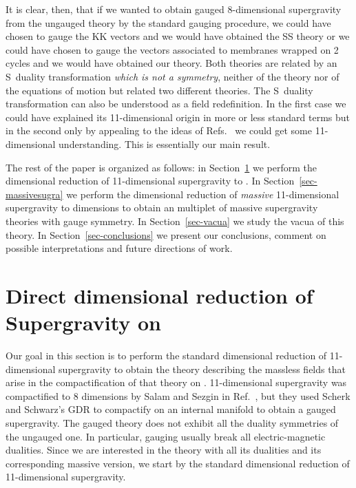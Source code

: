 \documentclass[12pt,a4paper]{article}
\begin{document}
It is clear, then, that if we wanted to obtain gauged 8-dimensional
supergravity from the ungauged theory by the standard gauging
procedure, we could have chosen to gauge the KK vectors and we would
have obtained the SS theory or we could have chosen to gauge the
vectors associated to membranes wrapped on 2 cycles and we would have
obtained our theory. Both theories are related by an S~duality
transformation {\it which is not a symmetry}, neither of the theory
nor of the equations of motion but related two different theories. The
S~duality transformation can also be understood as a field
redefinition.  In the first case we could have explained its
11-dimensional origin in more or less standard terms but in the second
only by appealing to the ideas of Refs.~\cite{kn:BLO,kn:MO} we could
get some 11-dimensional understanding.  This is essentially our main
result.

The rest of the paper is organized as follows: in
Section~\ref{sec-masslesssugra} we perform the dimensional reduction
of 11-dimensional supergravity to \coordHE{}. In
Section~\ref{sec-massivesugra} we perform the dimensional reduction of
{\it massive} 11-dimensional supergravity to \coordHE{} dimensions to
obtain an \coordHE{} multiplet of massive \coordHE{} supergravity
theories with \coordHE{} gauge symmetry.  In Section~\ref{sec-vacua} we
study the vacua of this theory.  In Section~\ref{sec-conclusions} we
present our conclusions, comment on possible interpretations and
future directions of work.


\section{Direct dimensional reduction of \coordHE{} Supergravity on \coordHE{}}
\label{sec-masslesssugra}

Our goal in this section is to perform the standard dimensional
reduction of 11-dimensional supergravity to obtain the theory
describing the massless fields that arise in the compactification of
that theory on \coordHE{}. 11-dimensional supergravity was compactified
to 8 dimensions by Salam and Sezgin in Ref.~\cite{kn:SaSe}, but they
used Scherk and Schwarz's GDR \cite{kn:SS} to compactify on an \coordHE{}
internal manifold to obtain a \coordHE{} gauged \coordHE{} supergravity. The
gauged theory does not exhibit all the duality symmetries of the
ungauged one. In particular, gauging usually break all
electric-magnetic dualities. Since we are interested in the theory
with all its dualities and its corresponding massive version, we start
by the standard dimensional reduction of 11-dimensional supergravity.
\end{document}
